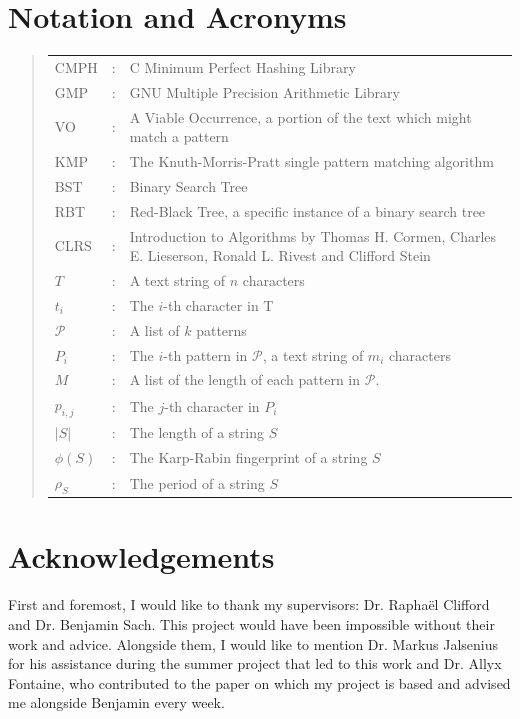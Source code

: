 \documentclass[ %
                    author={Dominic Joseph Moylett},
                    degree={MEng},
                     title={Dictionary Matching with Fingerprints},
                  subtitle={An Empirical Analysis},
                      type={Research},
                      year={2014} ]{dissertation}
\begin{document}

\chapter*{Notation and Acronyms}

\begin{quote}
\begin{tabular}{lcl}
CMPH &: & C Minimum Perfect Hashing Library \\
GMP &: & GNU Multiple Precision Arithmetic Library \\
VO &: & A Viable Occurrence, a portion of the text which might match a pattern \\
KMP &: & The Knuth-Morris-Pratt single pattern matching algorithm \\
BST &: & Binary Search Tree \\
RBT &: & Red-Black Tree, a specific instance of a binary search tree \\
CLRS &: & Introduction to Algorithms by Thomas H. Cormen, Charles E. Lieserson, Ronald L. Rivest and Clifford Stein \\
$T$ &: & A text string of $n$ characters \\
$t_i$ &: & The $i$-th character in T \\
$\mathcal{P}$ &: & A list of $k$ patterns \\
$P_i$ &: & The $i$-th pattern in $\mathcal{P}$, a text string of $m_i$ characters \\
$M$ &: & A list of the length of each pattern in $\mathcal{P}$. \\
$p_{i,j}$ &: & The $j$-th character in $P_i$ \\
$|S|$ &: & The length of a string $S$ \\
$\phi(S)$ &: & The Karp-Rabin fingerprint of a string $S$ \\
$\rho_S$ &: & The period of a string $S$ \\
\end{tabular}
\end{quote}


\chapter*{Acknowledgements}

First and foremost, I would like to thank my supervisors: Dr. Rapha\"{e}l Clifford and Dr. Benjamin Sach. This project would have been impossible without their work and advice. Alongside them, I would like to mention Dr. Markus Jalsenius for his assistance during the summer project that led to this work and Dr. Allyx Fontaine, who contributed to the paper on which my project is based and advised me alongside Benjamin every week.
\end{document}
